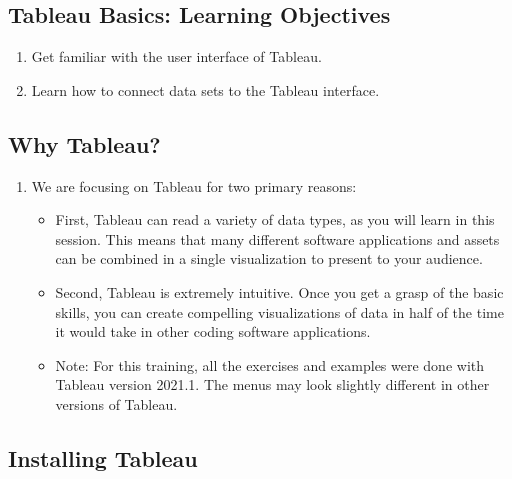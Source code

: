 \documentclass[
]{book}
\providecommand{\tightlist}{%
  \setlength{\itemsep}{0pt}\setlength{\parskip}{0pt}}
\begin{document}
\hypertarget{tableau-basics-learning-objectives}{%
\subsection{Tableau Basics: Learning Objectives}\label{tableau-basics-learning-objectives}}

\begin{enumerate}
\def\labelenumi{\arabic{enumi}.}
\item
  Get familiar with the user interface of Tableau.
\item
  Learn how to connect data sets to the Tableau interface.
\end{enumerate}

\hypertarget{why-tableau}{%
\subsection{Why Tableau?}\label{why-tableau}}

\begin{enumerate}
\def\labelenumi{\arabic{enumi}.}
\tightlist
\item
  We are focusing on Tableau for two primary reasons:

  \begin{itemize}
  \tightlist
  \item
    First, Tableau can read a variety of data types, as you will learn in this session. This means that many different software applications and assets can be combined in a single visualization to present to your audience.
  \item
    Second, Tableau is extremely intuitive. Once you get a grasp of the basic skills, you can create compelling visualizations of data in half of the time it would take in other coding software applications.
  \item
    Note: For this training, all the exercises and examples were done with Tableau version 2021.1. The menus may look slightly different in other versions of Tableau.
  \end{itemize}
\end{enumerate}

\hypertarget{installing-tableau}{%
\subsection{Installing Tableau}\label{installing-tableau}}
\end{document}
